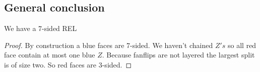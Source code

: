 \subsection{General conclusion}


\begin{lemma}
  \label{lm:}
  We have a 7-sided REL
\end{lemma}

\begin{proof}
  By construction a blue faces are 7-sided. We haven't chained $Z's$ so all red face contain at most one blue $Z$. Because fanflips are not layered the largest split is of size two. So red faces are 3-sided.
\end{proof}
